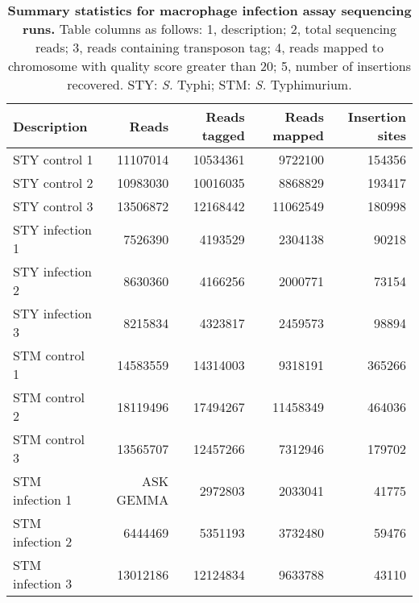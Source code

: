 %
\begin{table}
   \tiny
   \centering
   \noindent
    \caption[Summary statistics for macrophage infection assay sequencing runs]{\textbf{Summary statistics for macrophage infection assay sequencing runs.} Table columns as follows: 1, description; 2, total sequencing reads; 3, reads containing transposon tag; 4, reads mapped to chromosome with quality score greater than 20; 5, number of insertions recovered. STY: \textit{S.} Typhi; STM: \textit{S.} Typhimurium. }
    \begin{tabular}{ l
    				r
				r
				r
				r
				}
   
    \\
     \toprule
    \textbf{Description} & \textbf{Reads} & \textbf{Reads tagged} & \textbf{Reads mapped} & \textbf{Insertion sites} \\
    \midrule
    STY control 1 & 11107014 & 10534361 & 9722100 & 154356\\
    STY control 2 & 10983030 & 10016035 & 8868829 & 193417\\
    STY control 3 & 13506872 & 12168442 & 11062549 & 180998\\
    STY infection 1 & 7526390 & 4193529 & 2304138 & 90218\\
    STY infection 2 & 8630360 & 4166256 & 2000771 & 73154\\
    STY infection 3 & 8215834 & 4323817 & 2459573 & 98894\\
    STM control 1 & 14583559 & 14314003 & 9318191 & 365266\\
    STM control 2 & 18119496 & 17494267 & 11458349 & 464036\\
    STM control 3 & 13565707 & 12457266 & 7312946 & 179702\\
    STM infection 1 & {\color{red} ASK GEMMA} & 2972803 & 2033041 & 41775\\
    STM infection 2 & 6444469 & 5351193 & 3732480 & 59476\\
    STM infection 3 & 13012186 & 12124834 & 9633788 & 43110\\
    \bottomrule
    \end{tabular}%
    \label{tab:readmap}%
\end{table}

